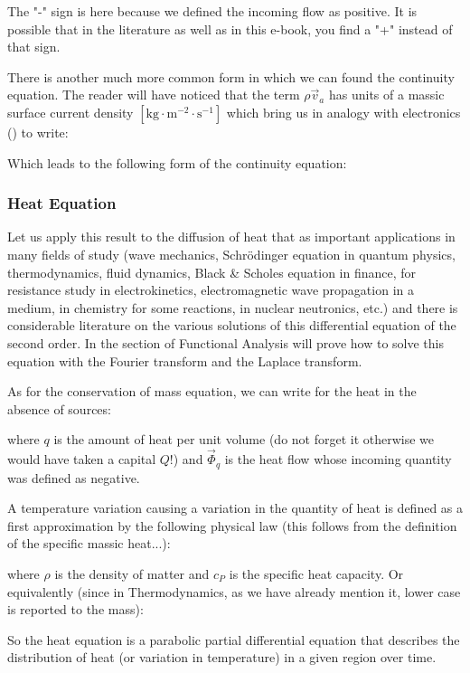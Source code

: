 	The "-" sign is here because we defined the incoming flow as positive. It is possible that in the literature as well as in this e-book, you find a "+" instead of that sign.
	
	There is another much more common form in which we can found the continuity equation. The reader will have noticed that the term $\rho\vec{v}_a$ has units of a massic surface current density  $[\text{kg}\cdot \text{m}^{-2}\cdot \text{s}^{-1}]$ which bring us in analogy with electronics () to write:
	
	Which leads to the following form of the continuity equation:
	
	
	\pagebreak
	\subsubsection{Heat Equation}
	Let us apply this result to the diffusion of heat that as important applications in many fields of study (wave mechanics, Schrödinger equation in quantum physics, thermodynamics, fluid dynamics, Black \& Scholes equation in finance, for resistance study in electrokinetics, electromagnetic wave propagation in a medium, in chemistry for some reactions, in nuclear neutronics, etc.) and there is considerable literature on the various solutions of this differential equation of the second order. In the section of Functional Analysis will prove how to solve this equation with the Fourier transform and the Laplace transform.

	As for the conservation of mass equation, we can write for the heat in the absence of sources:
	
	where  $q$ is the amount of heat per unit volume (do not forget it otherwise we would have taken a capital $Q$!) and $\vec{\Phi}_q$ is the heat flow whose incoming quantity was defined as negative.

	A temperature variation causing a variation in the quantity of heat is defined as a first approximation by the following physical law (this follows from the definition of the specific massic heat...):
	
	where $\rho$ is the density of matter and $c_P$ is the specific heat capacity. Or equivalently (since in Thermodynamics, as we have already mention it, lower case is reported to the mass):
	
	
	So the heat equation is a parabolic partial differential equation that describes the distribution of heat (or variation in temperature) in a given region over time. 
	
